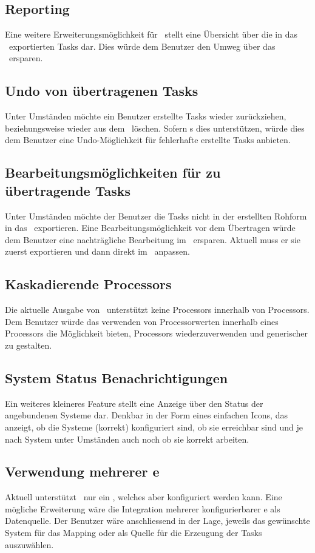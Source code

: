 		
		\subsection{Reporting}
			Eine weitere Erweiterungsmöglichkeit für \eeppi\ stellt eine Übersicht über die in das \ppt\ exportierten Tasks dar.
			Dies würde dem Benutzer den Umweg über das \ppt\ ersparen.
		
		
		\subsection{Undo von übertragenen Tasks}
			Unter Umständen möchte ein Benutzer erstellte Tasks wieder zurückziehen,
			beziehungsweise wieder aus dem \ppt\ löschen.
			Sofern \ppt s dies unterstützen, würde dies dem Benutzer eine Undo-Möglichkeit für fehlerhafte erstellte Tasks anbieten.
		
		
		\subsection{Bearbeitungsmöglichkeiten für zu übertragende Tasks}
			Unter Umständen möchte der Benutzer die Tasks nicht in der erstellten Rohform in das \ppt\ exportieren.
			Eine Bearbeitungsmöglichkeit vor dem Übertragen würde dem Benutzer eine nachträgliche Bearbeitung im \ppt\ ersparen.
			Aktuell muss er sie zuerst exportieren und dann direkt im \ppt\ anpassen.
			
			
		\subsection{Kaskadierende Processors}
			Die aktuelle Ausgabe von \eeppi\ unterstützt keine Processors innerhalb von Processors.
			Dem Benutzer würde das verwenden von Processorwerten innerhalb eines Processors die Möglichkeit bieten, Processors wiederzuverwenden und generischer zu gestalten.
			
			
		\subsection{System Status Benachrichtigungen}
			Ein weiteres kleineres Feature stellt eine Anzeige über den Status der angebundenen Systeme dar.
			Denkbar in der Form eines einfachen Icons, das anzeigt, 
			ob die Systeme (korrekt) konfiguriert sind, ob sie erreichbar sind
			und je nach System unter Umständen auch noch ob sie korrekt arbeiten.		
		
		
	
		\subsection{Verwendung mehrerer \dks e}
			Aktuell unterstützt \eeppi\ nur ein \dks, welches aber konfiguriert werden kann.
			Eine mögliche Erweiterung wäre die Integration mehrerer konfigurierbarer \dks e als Datenquelle.
			Der Benutzer wäre anschliessend in der Lage, jeweils das gewünschte System für das Mapping oder als Quelle für die Erzeugung der Tasks auszuwählen.
		
